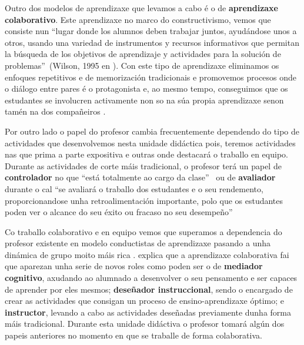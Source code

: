 Outro dos modelos de aprendizaxe que levamos a cabo é o de \textbf{aprendizaxe colaborativo}. Este aprendizaxe no marco do constructivismo, vemos que consiste nun  ``lugar donde los alumnos deben trabajar juntos, ayudándose unos a otros, usando una variedad de instrumentos y recursos informativos que permitan la búsqueda de los objetivos de aprendizaje y actividades para la solución de problemas''~(Wilson, 1995 en ). Con este tipo de aprendizaxe eliminamos os enfoques repetitivos e de memorización tradicionais e promovemos procesos onde o diálogo entre pares é o protagonista e, ao mesmo tempo, conseguimos que os estudantes se involucren activamente non so na súa propia aprendizaxe senon tamén na dos compañeiros \cite{calzadilla2002aprendizaje, collazos2001aprendizaje}.

Por outro lado o papel do profesor cambia frecuentemente dependendo do tipo de actividades que desenvolvemos nesta unidade didáctica pois, teremos actividades nas que prima a parte expositiva e outras onde destacará o traballo en equipo. Durante as actividades de corte máis tradicional, o profesor terá un papel de \textbf{controlador} no que ``está totalmente ao cargo da clase''~\cite[p.~5]{rubiogarciarolesextranjeros} ou de \textbf{avaliador} durante o cal ``se avaliará o traballo dos estudantes e o seu rendemento, proporcionandose unha retroalimentación importante, polo que os estudantes poden ver o alcance do seu éxito ou fracaso no seu desempeño''~\cite[p.~5]{rubiogarciarolesextranjeros}

Co traballo colaborativo e en equipo vemos que superamos a dependencia do profesor existente en modelo conductistas de aprendizaxe pasando a unha dinámica de grupo moito máis rica \cite{calzadilla2002aprendizaje}.  explica que a aprendizaxe colaborativa fai que aparezan unha serie de novos roles como poden ser o de \textbf{mediador cognitivo}, axudando ao alumnado a desenvolver o seu pensamento e ser capaces de aprender por eles mesmos; \textbf{deseñador instruccional}, sendo o encargado de crear as actividades que consigan un proceso de ensino-aprendizaxe óptimo; e \textbf{instructor}, levando a cabo as actividades deseñadas previamente dunha forma máis tradicional. Durante esta unidade didáctiva o profesor tomará algún dos papeis anteriores no momento en que se traballe de forma colaborativa.




